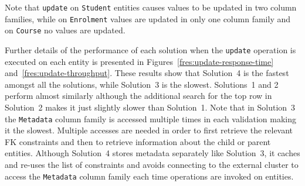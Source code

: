 % 
Note that \texttt{update} on \texttt{Student} entities causes values to be
updated in two column families,  while on \texttt{Enrolment} values are
updated in only one column family and on \texttt{Course} no values are updated.  


Further details of the performance of each solution when the \texttt{update}
operation is executed on each entity is presented in
Figures~\ref{fres:update-response-time} and~\ref{fres:update-throughput}.
These results show that Solution~4 is the fastest amongst all the solutions, 
while Solution~3 is the slowest.
Solutions~1 and 2 perform almost similarly although the additional search for
the top row in Solution~2 makes it just slightly slower than Solution~1.
Note that in Solution~3 the \texttt{Metadata} column family is accessed multiple
times in each validation making it the slowest.  Multiple accesses are needed in
order to first retrieve the relevant \ac{FK} constraints and then to retrieve
information about the child or parent entities.  Although Solution~4 stores
metadata separately like Solution~3,  it caches and re-uses
the list of constraints and avoids connecting to the external cluster to access
the \texttt{Metadata} column family each time  operations are invoked on entities.

